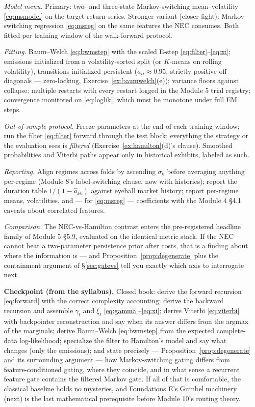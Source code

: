 \documentclass[11pt]{article}
\numberwithin{equation}{section}
\theoremstyle{plain}
\theoremstyle{definition}
\theoremstyle{remark}
\newcommand{\resp}{\gamma}
\begin{document}
\emph{Model menu.} Primary: two- and three-state Markov-switching mean--volatility \eqref{eq:msmodel} on the target return series. Stronger variant (closer fight): Markov-switching regression \eqref{eq:msreg} on the same features the NEC consumes. Both fitted per training window of the walk-forward protocol.

\emph{Fitting.} Baum--Welch \eqref{eq:bwmstep} with the scaled E-step \eqref{eq:filter}--\eqref{eq:xi}; emissions initialized from a volatility-sorted split (or $K$-means on rolling volatility), transitions initialized persistent ($a_{ii} \approx 0.95$, strictly positive off-diagonals --- zero-locking, Exercise~\ref{ex:baumwelch}(e)); variance floors against collapse; multiple restarts with every restart logged in the Module 5 trial registry; convergence monitored on \eqref{eq:loglik}, which must be monotone under full EM steps.

\emph{Out-of-sample protocol.} Freeze parameters at the end of each training window; run the filter \eqref{eq:filter} forward through the test block; everything the strategy or the evaluation sees is \emph{filtered} (Exercise~\ref{ex:hamilton}(d)'s clause). Smoothed probabilities and Viterbi paths appear only in historical exhibits, labeled as such.

\emph{Reporting.} Align regimes across folds by ascending $\sigma_k$ before averaging anything per-regime (Module 8's label-switching clause, now with histories); report the duration table $1/(1 - \hat a_{kk})$ against eyeball market history; report per-regime means, volatilities, and --- for \eqref{eq:msreg} --- coefficients with the Module 4 \S4.1 caveats about correlated features.

\emph{Comparison.} The NEC-vs-Hamilton contrast enters the pre-registered headline family of Module 5 \S5.9, evaluated on the identical metric stack. If the NEC cannot beat a two-parameter persistence prior after costs, that is a finding about where the information is --- and Proposition~\ref{prop:degenerate} plus the containment argument of \S\ref{sec:gatevs} tell you exactly which axis to interrogate next.

\medskip
\noindent\textbf{Checkpoint (from the syllabus).} Closed book: derive the forward recursion \eqref{eq:forward} with the correct complexity accounting; derive the backward recursion and assemble $\resp_t$ and $\xi_t$ \eqref{eq:gamma}--\eqref{eq:xi}; derive Viterbi \eqref{eq:viterbi} with backpointer reconstruction and say when its answer differs from the argmax of the marginals; derive Baum--Welch \eqref{eq:bwmstep} from the expected complete-data log-likelihood; specialize the filter to Hamilton's model and say what changes (only the emissions); and state precisely --- Proposition~\ref{prop:degenerate} and its surrounding argument --- how Markov-switching gating differs from feature-conditioned gating, where they coincide, and in what sense a recurrent feature gate contains the filtered Markov gate. If all of that is comfortable, the classical baseline holds no mysteries, and Foundations E's Gumbel machinery (next) is the last mathematical prerequisite before Module 10's routing theory.
\end{document}
